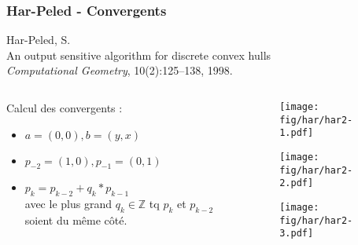 \begin{frame}
  \frametitle{Har-Peled - Convergents}

	\begin{block}{}
	\begin{tiny}
    [H98] Har-Peled, S.\\
    An output sensitive algorithm for discrete convex hulls\\
    {\em Computational Geometry}, 10(2):125--138, 1998.\\
    \end{tiny}
	\end{block} 


	\begin{columns}[t]
 		\begin{column}{5cm}
  		
			\begin{block}{}
	      Calcul des convergents :
	      \begin{itemize}
	        \item $a = (0,0), b = (y, x)$
	        \item $p_{-2} = (1,0), p_{-1} = (0,1)$
					\item<2-> \alert{$ p_{k} = p_{k-2} + q_{k}*p_{k-1}$}\\
		      avec le plus grand $q_{k} \in \mathbb{Z}$ tq $p_{k}$ et $p_{k-2}$ soient du même côté.
	      \end{itemize}
	    \end{block}
		\end{column}

		\begin{column}{5cm}
			\only<1>
			{
				\begin{figure}[h!]
					\centering
				  \texttt{[image: fig/har/har2-1.pdf]}
			 	\end{figure}    
			}
			{
				\begin{figure}[h!]
					\centering
				  \texttt{[image: fig/har/har2-2.pdf]}
			 	\end{figure}    
			}
			{
				\begin{figure}[h!]
					\centering
				  \texttt{[image: fig/har/har2-3.pdf]}
			 	\end{figure}    
			}
	  \end{column}
	\end{columns}  

\end{frame}


